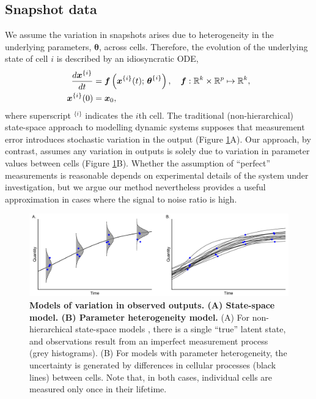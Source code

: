 \subsection{Snapshot data}
We assume the variation in snapshots arises due to heterogeneity in the underlying parameters, $\boldsymbol{\theta}$, across cells. Therefore, the evolution of the underlying state of cell $i$ is described by an idiosyncratic ODE,
%
\begin{equation} \label{eq:ode_i}
\begin{aligned}
\frac{d\boldsymbol{x}^{\{i\}}}{dt} &= \boldsymbol{f} \left( \boldsymbol{x}^{\{i\}}(t); \, \boldsymbol{\theta}^{\{i\}} \right),
                                      \quad \boldsymbol{f}: \mathbb{R}^k \times \mathbb{R}^p \mapsto \mathbb{R}^k, \\
\boldsymbol{x}^{\{i\}}(0) &= \boldsymbol{x}_0,
\end{aligned}
\end{equation}
where superscript $^{\{i\}}$ indicates the $i$th cell.
%
The traditional (non-hierarchical) state-space approach to modelling dynamic systems supposes that measurement error introduces stochastic variation in the output (Figure \ref{fig:data_generation}A). Our approach, by contrast, assumes any variation in outputs is solely due to variation in parameter values between cells (Figure \ref{fig:data_generation}B). Whether the assumption of ``perfect'' measurements is reasonable depends on experimental details of the system under investigation, but we argue our method nevertheless provides a useful approximation in cases where the signal to noise ratio is high.

\begin{figure}[H]
  \centerline{\includegraphics[width=\textwidth]{../figures/data_generation.pdf}}
  \caption{\textbf{Models of variation in observed outputs. (A) State-space model. (B) Parameter heterogeneity model.} (A) For non-hierarchical state-space models , there is a single ``true'' latent state, and observations result from an imperfect measurement process (grey histograms). (B) For models with parameter heterogeneity, the uncertainty is generated by differences in cellular processes (black lines) between cells. Note that, in both cases, individual cells are measured only once in their lifetime.}
  \label{fig:data_generation}
\end{figure}

